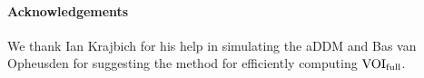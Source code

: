 
\paragraph{Acknowledgements}
We thank Ian Krajbich for his help in simulating the aDDM and Bas van Opheusden for suggesting the method for efficiently computing $\text{VOI}_\text{full}$.


